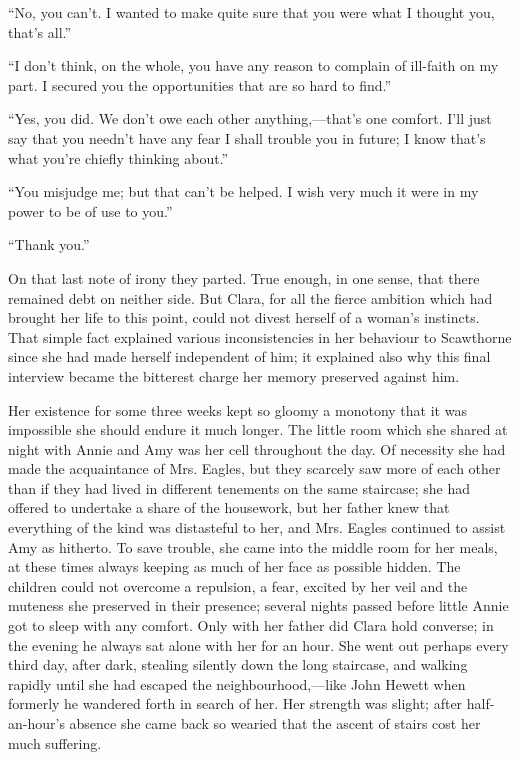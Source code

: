 ``No, you can't. I wanted to make quite
{\protect\hypertarget{56}{}{}}sure that you were what I thought you,
that's all.''

``I don't think, on the whole, you have any reason to complain of
ill-faith on my part. I secured you the opportunities that are so hard
to find.''

``Yes, you did. We don't owe each other anything,---that's one comfort.
I'll just say that you needn't have any fear I shall trouble you in
future; I know that's what you're chiefly thinking about.''

``You misjudge me; but that can't be helped. I wish very much it were in
my power to be of use to you.''

``Thank you.''

On that last note of irony they parted. True enough, in one sense, that
there remained debt on neither side. But Clara, for all the fierce
ambition which had brought her life to this point, could not divest
herself of a woman's instincts. That simple fact explained various
inconsistencies in her behaviour to Scawthorne since she had made
herself independent of him; it explained also why this final interview
became the bitterest charge her memory preserved against him.

{\protect\hypertarget{57}{}{}}Her existence for some three weeks kept so
gloomy a monotony that it was impossible she should endure it much
longer. The little room which she shared at night with Annie and Amy was
her cell throughout the day. Of necessity she had made the acquaintance
of Mrs. Eagles, but they scarcely saw more of each other than if they
had lived in different tenements on the same staircase; she had offered
to undertake a share of the housework, but her father knew that
everything of the kind was distasteful to her, and Mrs. Eagles continued
to assist Amy as hitherto. To save trouble, she came into the middle
room for her meals, at these times always keeping as much of her face as
possible hidden. The children could not overcome a repulsion, a fear,
excited by her veil and the muteness she preserved in their presence;
several nights passed before little Annie got to sleep with any comfort.
Only with her father did Clara hold converse; in the evening he always
sat alone with her for an hour. She went out perhaps every third day,
after dark, stealing silently down the long staircase, and walking
rapidly until she had escaped the
{\protect\hypertarget{58}{}{}}neighbourhood,---like John Hewett when
formerly he wandered forth in search of her. Her strength was slight;
after half-an-hour's absence she came back so wearied that the ascent of
stairs cost her much suffering.

